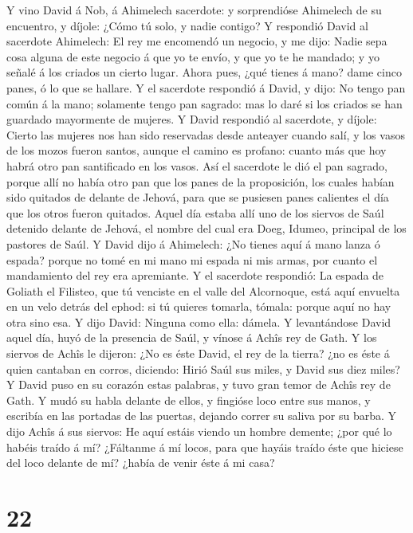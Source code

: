  Y vino David á Nob, á Ahimelech sacerdote: y sorprendióse
Ahimelech de su encuentro, y díjole: ¿Cómo tú solo, y nadie contigo?
 Y respondió David al sacerdote Ahimelech: El rey me
encomendó un negocio, y me dijo: Nadie sepa cosa alguna de este negocio
á que yo te envío, y que yo te he mandado; y yo señalé á los criados un
cierto lugar.  Ahora pues, ¿qué tienes á mano? dame cinco
panes, ó lo que se hallare.  Y el sacerdote respondió á
David, y dijo: No tengo pan común á la mano; solamente tengo pan
sagrado: mas lo daré si los criados se han guardado mayormente de
mujeres.  Y David respondió al sacerdote, y díjole: Cierto
las mujeres nos han sido reservadas desde anteayer cuando salí, y los
vasos de los mozos fueron santos, aunque el camino es profano: cuanto
más que hoy habrá otro pan santificado en los vasos.  Así el
sacerdote le dió el pan sagrado, porque allí no había otro pan que los
panes de la proposición, los cuales habían sido quitados de delante de
Jehová, para que se pusiesen panes calientes el día que los otros fueron
quitados.  Aquel día estaba allí uno de los siervos de Saúl
detenido delante de Jehová, el nombre del cual era Doeg, Idumeo,
principal de los pastores de Saúl.  Y David dijo á
Ahimelech: ¿No tienes aquí á mano lanza ó espada? porque no tomé en mi
mano mi espada ni mis armas, por cuanto el mandamiento del rey era
apremiante.  Y el sacerdote respondió: La espada de Goliath
el Filisteo, que tú venciste en el valle del Alcornoque, está aquí
envuelta en un velo detrás del ephod: si tú quieres tomarla, tómala:
porque aquí no hay otra sino esa. Y dijo David: Ninguna como ella:
dámela.  Y levantándose David aquel día, huyó de la
presencia de Saúl, y vínose á Achîs rey de Gath.  Y los
siervos de Achîs le dijeron: ¿No es éste David, el rey de la tierra? ¿no
es éste á quien cantaban en corros, diciendo: Hirió Saúl sus miles, y
David sus diez miles?  Y David puso en su corazón estas
palabras, y tuvo gran temor de Achîs rey de Gath.  Y mudó
su habla delante de ellos, y fingióse loco entre sus manos, y escribía
en las portadas de las puertas, dejando correr su saliva por su barba.
 Y dijo Achîs á sus siervos: He aquí estáis viendo un
hombre demente; ¿por qué lo habéis traído á mí?  ¿Fáltanme
á mí locos, para que hayáis traído éste que hiciese del loco delante de
mí? ¿había de venir éste á mi casa?

\hypertarget{section-21}{%
\section{22}\label{section-21}}

